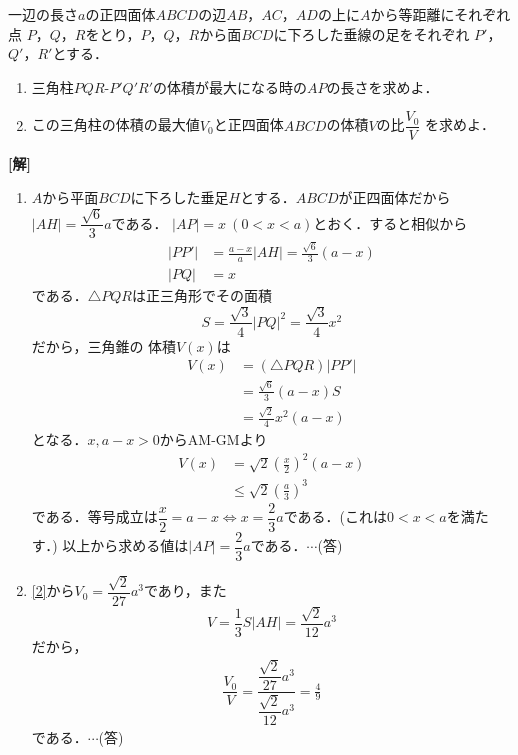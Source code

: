 \documentclass[a4j]{jarticle}
\begin{document}

     \begin{oframed}
     一辺の長さ$a$の正四面体$ABCD$の辺$AB$，$AC$，$AD$の上に$A$から等距離にそれぞれ点
     $P$，$Q$，$R$をとり，$P$，$Q$，$R$から面$BCD$に下ろした垂線の足をそれぞれ
     $P'$，$Q'$，$R'$とする．
          \begin{enumerate}[(1)]
          \item 三角柱$PQR$-$P'Q'R'$の体積が最大になる時の$AP$の長さを求めよ．
          \item この三角柱の体積の最大値$V_0$と正四面体$ABCD$の体積$V$の比$\dfrac{V_0}{V}$
          を求めよ．
          \end{enumerate}
     \end{oframed}

\setlength{\columnseprule}{0.4pt}
\begin{multicols}{2}
{\bf[解]}
\begin{enumerate}[(1)]
\item  $A$から平面$BCD$に下ろした垂足$H$とする．$ABCD$が正四面体だから
$|AH|=\dfrac{\sqrt{6}}{3}a$である．
$|AP|=x \ (0<x<a)$とおく．すると相似から
     \begin{align*}
     |PP'|&=\frac{a-x}{a}|AH|=\frac{\sqrt{6}}{3}(a-x) \\
     |PQ|&=x
     \end{align*}
である．$\triangle PQR$は正三角形でその面積
     \[S=\dfrac{\sqrt{3}}{4}|PQ|^2=\dfrac{\sqrt{3}}{4}x^2\]
だから，三角錐の
体積$V(x)$は
     \begin{align*}
     V(x)&=(\triangle PQR)|PP'| \\
     &=\frac{\sqrt{6}}{3}(a-x)S \\
     &=\frac{\sqrt{2}}{4}x^2(a-x)
     \end{align*}
となる．$x,a-x>0$からAM-GMより
     \begin{align}
     V(x)&=\sqrt{2}\left(\frac{x}{2}\right)^2(a-x) \nonumber\\
     &\le\sqrt{2}\left(\frac{a}{3}\right)^3\label{2}
     \end{align}
である．等号成立は$\dfrac{x}{2}=a-x\Longleftrightarrow x=\dfrac{2}{3}a$である．(これは$0<x<a$を満たす．)
以上から求める値は$|AP|=\dfrac{2}{3}a$である．$\cdots$(答)

\item \eqref{2}から$V_0=\dfrac{\sqrt{2}}{27}a^3$であり，また
     \[V=\dfrac{1}{3}S|AH|=\dfrac{\sqrt{2}}{12}a^3 \]
だから，
     \begin{align*}
     \dfrac{V_0}{V}=\dfrac{\dfrac{\sqrt{2}}{27}a^3}{\dfrac{\sqrt{2}}{12}a^3}=\frac{4}{9}
     \end{align*}
である．$\cdots$(答)
\end{enumerate}
\newpage
\end{multicols}
\end{document}
